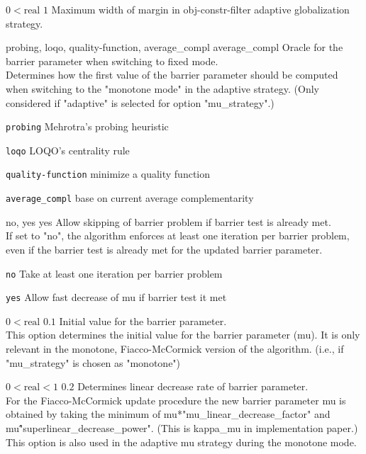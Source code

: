 %
{$0<\textrm{real}$}%
{$1$}%
{Maximum width of margin in obj-constr-filter adaptive globalization strategy.}%
{}

%
{\ttfamily probing, loqo, quality-function, average\_compl}%
{average\_compl}%
{Oracle for the barrier parameter when switching to fixed mode.\\
Determines how the first value of the barrier parameter should be computed when switching to the "monotone mode" in the adaptive strategy. (Only considered if "adaptive" is selected for option "mu\_strategy".)}%
{\begin{list}{}{
\setlength{\parsep}{0em}
\setlength{\leftmargin}{5ex}
\setlength{\labelwidth}{2ex}
\setlength{\itemindent}{0ex}
\setlength{\topsep}{0pt}}
\item[\texttt{probing}] Mehrotra's probing heuristic
\item[\texttt{loqo}] LOQO's centrality rule
\item[\texttt{quality-function}] minimize a quality function
\item[\texttt{average\_compl}] base on current average complementarity
\end{list}
}

%
{\ttfamily no, yes}%
{yes}%
{Allow skipping of barrier problem if barrier test is already met.\\
If set to "no", the algorithm enforces at least one iteration per barrier problem, even if the barrier test is already met for the updated barrier parameter.}%
{\begin{list}{}{
\setlength{\parsep}{0em}
\setlength{\leftmargin}{5ex}
\setlength{\labelwidth}{2ex}
\setlength{\itemindent}{0ex}
\setlength{\topsep}{0pt}}
\item[\texttt{no}] Take at least one iteration per barrier problem
\item[\texttt{yes}] Allow fast decrease of mu if barrier test it met
\end{list}
}

%
{$0<\textrm{real}$}%
{$0.1$}%
{Initial value for the barrier parameter.\\
This option determines the initial value for the barrier parameter (mu).  It is only relevant in the monotone, Fiacco-McCormick version of the algorithm. (i.e., if "mu\_strategy" is chosen as "monotone")}%
{}

%
{$0<\textrm{real}<1$}%
{$0.2$}%
{Determines linear decrease rate of barrier parameter.\\
For the Fiacco-McCormick update procedure the new barrier parameter mu is obtained by taking the minimum of mu*"mu\_linear\_decrease\_factor" and mu\^"superlinear\_decrease\_power".  (This is kappa\_mu in implementation paper.) This option is also used in the adaptive mu strategy during the monotone mode.}%
{}

